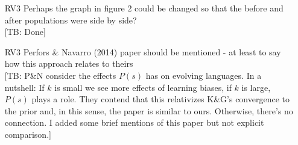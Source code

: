 \documentclass[10pt,a4paper]{article}
\newcommand{\tb}[1]{\textcolor[rgb]{.8,.33,.0}{[TB: #1]}}%
\newcommand{\type}[1]{\ensuremath{\tau_{#1}}}
\newcommand{\postparameter}{\ensuremath{\gamma}}
\begin{document}
\begin{itemize}
\begin{itemize}
	\item $t$ is both {\em teacher} and {\em type}\\ \tb{True \type{} for {\em type}}
	\item $l$ is both {\em learner} and {\em posterior parameter}\\ \tb{True \postparameter~ for {\em posterior parameter}}
	\item $a$ to index actual state is counterintuitive\\ \tb{Disagree. I'd leave it as is.}
	\item Switch from $s_l$ to $s_p$ in case studies\\ \tb{This is intended as it encompasses teacher and learner perception. I clarified this}
	\item Consistent distinction between $P_N$ and $P$ (e.g. first two equations on p.2)\\
	\tb{Done}
	\item $P(t|d_l)$: $s$ is not defined within the binomial; is the sum in $succ\_prob$ really over $t$ (not $d$)?\\ \tb{Everything seems correct to me. With more space it would help to clarify how summing up to $\type{}-1$ in {\em succ.prob} relates to the speaker behavior of teacher of type \type{}, which is the confusing bit in this term. Then again, we at least have an intuitive explanation of the formula so I hope we're fine with only 1/3 of the reviewers being confused by this.}
	\item write out the binomial pmf, not its parameterisation on p.4\\ \tb{I find our formulation easier to parse, so I left it. But if you think it's non-standard we can replace it by the pmf}
	\item scalar d vs sequence/vector d\\ \tb{Haven't caught where $d$ is allegedly used as a scalar}
      \end{itemize}
    \item [RV3] Perhaps the graph in figure 2 could be changed so that the before and after populations were side by side?\\ \tb{Done}
    \item [RV3] Perfors \& Navarro (2014) paper should be mentioned - at least to say how this approach relates to theirs \\ \tb{P\&N consider the effects $P(s)$ has on evolving languages. In a nutshell: If $k$ is small we see more effects of learning biases, if $k$ is large, $P(s)$ plays a role. They contend that this relativizes K\&G's convergence to the prior and, in this sense, the paper is similar to ours. Otherwise, there's no connection. I added some brief mentions of this paper but not explicit comparison.}
  \end{itemize}
\end{document}
